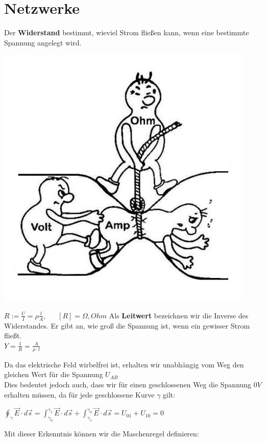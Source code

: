 \section{Netzwerke}
\label{chap:Style}



\beginip
Der \textbf{Widerstand} bestimmt, wieviel Strom fließen kann, wenn eine bestimmte Spannung angelegt wird. \\
\begin{center}
	\includegraphics[scale=0.25]{img/widerstand.png}
\end{center}
\formulaBegin
$ R :=  \frac{U}{I} =  \rho  \frac{l}{A}, \ \ \ \ \ \ \  {[R]} = \Omega, Ohm $
\formulaEnd
Als \textbf{Leitwert} bezeichnen wir die Inverse des Widerstandes. Er gibt an, wie groß die Spannung ist, wenn ein gewisser Strom fließt. \\
\formulaBegin
$ Y = \frac{1}{R} = \frac{A}{\rho \cdot l} $
\formulaEnd
\iend




Da das elektrische Feld wirbelfrei ist, erhalten wir unabhängig vom Weg den gleichen Wert für die Spannung $ U_{AB} $ \\
Dies bedeutet jedoch auch, dass wir für einen geschlossenen Weg die Spannung $0V$ erhalten müssen, da für jede geschlossene Kurve $\gamma$ gilt:
\begin{center}
	\vspace{-2mm}

	$\displaystyle \oint_{\gamma} \vec{E} \cdot d\vec{s} = \int_{\gamma_0}^{\gamma_1} \vec{E} \cdot d\vec{s} + \int_{\gamma_1}^{\gamma_0} \vec{E} \cdot d\vec{s} = U_{01} + U_{10} = 0$
\end{center}
Mit dieser Erkenntnis können wir die Maschenregel definieren:

